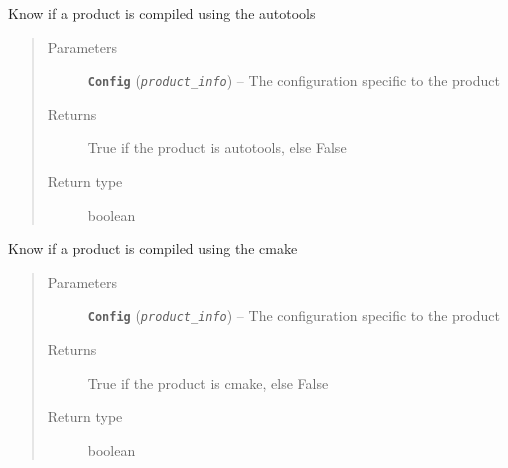 \documentclass[a4paper,10pt,english]{sphinxmanual}
\begin{document}
\begin{fulllineitems}
\label{commands/apidoc/src:src.product.product_is_autotools}
Know if a product is compiled using the autotools
\begin{quote}\begin{description}
\item[{Parameters}] \leavevmode
\textbf{\texttt{Config}} (\emph{\texttt{product\_info}}) -- The configuration specific to 
the product

\item[{Returns}] \leavevmode
True if the product is autotools, else False

\item[{Return type}] \leavevmode
boolean

\end{description}\end{quote}

\end{fulllineitems}


\begin{fulllineitems}
\label{commands/apidoc/src:src.product.product_is_cmake}
Know if a product is compiled using the cmake
\begin{quote}\begin{description}
\item[{Parameters}] \leavevmode
\textbf{\texttt{Config}} (\emph{\texttt{product\_info}}) -- The configuration specific to 
the product

\item[{Returns}] \leavevmode
True if the product is cmake, else False

\item[{Return type}] \leavevmode
boolean

\end{description}\end{quote}

\end{fulllineitems}

\end{document}

